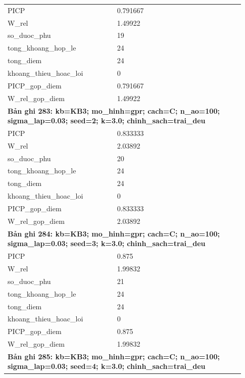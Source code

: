 \begin{longtable}{p{0.43\linewidth}p{0.50\linewidth}}
PICP & 0.791667 \\
W\_\allowbreak rel & 1.49922 \\
so\_\allowbreak duoc\_\allowbreak phu & 19 \\
tong\_\allowbreak khoang\_\allowbreak hop\_\allowbreak le & 24 \\
tong\_\allowbreak diem & 24 \\
khoang\_\allowbreak thieu\_\allowbreak hoac\_\allowbreak loi & 0 \\
PICP\_\allowbreak gop\_\allowbreak diem & 0.791667 \\
W\_\allowbreak rel\_\allowbreak gop\_\allowbreak diem & 1.49922 \\
\midrule
\multicolumn{2}{p{0.95\linewidth}}{\textbf{Bản ghi 283: kb=KB3; mo\_hinh=gpr; cach=C; n\_ao=100; sigma\_lap=0.03; seed=2; k=3.0; chinh\_sach=trai\_deu}} \\
PICP & 0.833333 \\
W\_\allowbreak rel & 2.03892 \\
so\_\allowbreak duoc\_\allowbreak phu & 20 \\
tong\_\allowbreak khoang\_\allowbreak hop\_\allowbreak le & 24 \\
tong\_\allowbreak diem & 24 \\
khoang\_\allowbreak thieu\_\allowbreak hoac\_\allowbreak loi & 0 \\
PICP\_\allowbreak gop\_\allowbreak diem & 0.833333 \\
W\_\allowbreak rel\_\allowbreak gop\_\allowbreak diem & 2.03892 \\
\midrule
\multicolumn{2}{p{0.95\linewidth}}{\textbf{Bản ghi 284: kb=KB3; mo\_hinh=gpr; cach=C; n\_ao=100; sigma\_lap=0.03; seed=3; k=3.0; chinh\_sach=trai\_deu}} \\
PICP & 0.875 \\
W\_\allowbreak rel & 1.99832 \\
so\_\allowbreak duoc\_\allowbreak phu & 21 \\
tong\_\allowbreak khoang\_\allowbreak hop\_\allowbreak le & 24 \\
tong\_\allowbreak diem & 24 \\
khoang\_\allowbreak thieu\_\allowbreak hoac\_\allowbreak loi & 0 \\
PICP\_\allowbreak gop\_\allowbreak diem & 0.875 \\
W\_\allowbreak rel\_\allowbreak gop\_\allowbreak diem & 1.99832 \\
\midrule
\multicolumn{2}{p{0.95\linewidth}}{\textbf{Bản ghi 285: kb=KB3; mo\_hinh=gpr; cach=C; n\_ao=100; sigma\_lap=0.03; seed=4; k=3.0; chinh\_sach=trai\_deu}} \\

\end{longtable}
